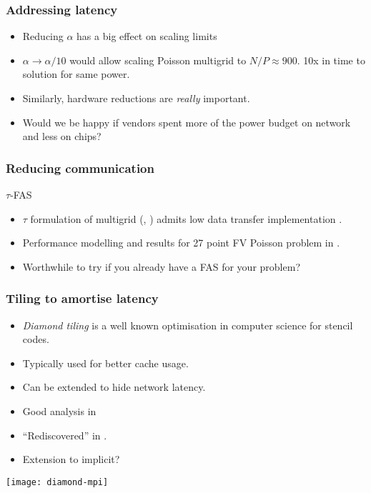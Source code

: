 \documentclass[presentation]{beamer}
\begin{document}
\begin{frame}
  \frametitle{Addressing latency}

  \begin{itemize}
  \item Reducing $\alpha$ has a big effect on scaling limits
  \item $\alpha \rightarrow \alpha/10$ would allow scaling Poisson
    multigrid to $N/P\approx 900$.  \alert{10x} in time to solution
    for same power.
  \item Similarly, hardware reductions are \emph{really} important.
  \item Would we be happy if vendors spent more of the power budget on
    network and less on chips?
  \end{itemize}
\end{frame}

\begin{frame}
  \frametitle{Reducing communication}

  \begin{block}{$\tau$-FAS}
    \begin{itemize}
    \item $\tau$ formulation of multigrid (\textcite{Brandt:1977},
      \textcite[\S 8.3]{Brandt:2011}) admits low data transfer
      implementation \parencite{Brandt:1994}.

    \item Performance modelling and results for 27 point FV Poisson
      problem in \textcite{Adams:2016}.

    \item Worthwhile to try if you already have a FAS for your problem?
    \end{itemize}
  \end{block}
\end{frame}

\begin{frame}
  \frametitle{Tiling to amortise latency}
  \begin{itemize}
  \item  \emph{Diamond tiling} is a well known optimisation in computer
    science for stencil codes.
  \item Typically used for better cache usage.
  \item Can be extended to hide network latency.
  \item Good analysis in \textcite{Malas:2015}
  \item ``Rediscovered'' in \textcite{Alhubail:2016}.
  \item Extension to implicit?
  \end{itemize}
  \begin{center}
    \texttt{[image: diamond-mpi]}
  \end{center}
\end{frame}
\end{document}
